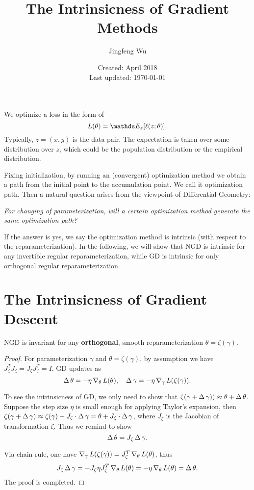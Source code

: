 \documentclass{article}
\title{The Intrinsicness of Gradient Methods}
\author{Jingfeng Wu}
\date{Created: April 2018 \\ Last updated: \today}
\begin{document}
\maketitle

We optimize a loss in the form of
\begin{equation}\label{eq:loss}
    L(\theta) = \Ebb_z [\ell(z;\theta)].
\end{equation}
Typically, $z = (x,y)$ is the data pair. The expectation is taken over some distribution over $z$, which could be the population distribution or the empirical distribution.

Fixing initialization, by running an (convergent) optimization method we obtain a path from the initial point to the accumulation point. We call it optimization path.
Then a natural question arises from the viewpoint of Differential Geometry:

\emph{For changing of parameterization, will a certain optimization method generate the same optimization path?}

If the answer is yes, we say the optimization method is intrinsic (with respect to the reparameterization).
In the following, we will show that NGD is intrinsic for any invertible regular reparameterization, while GD is intrinsic for only orthogonal regular reparameterization.

\section{The Intrinsicness of Gradient Descent}
\begin{thm}\label{thm:gd}
NGD is invariant for any \textbf{orthogonal}, smooth reparameterization $\theta = \zeta (\gamma)$.
\end{thm}
\begin{proof}
For parameterization $\gamma$ and $\theta=\zeta(\gamma)$, by assumption we have $J_{\zeta}^T J_{\zeta} = J_{\zeta} J_{\zeta}^T = I$.
GD updates as
\begin{equation}
    \operatorname{\Delta}\theta = -\eta \operatorname{\nabla}_{\theta} L(\theta),\quad
    \operatorname{\Delta} \gamma = -\eta \operatorname{\nabla}_{\gamma} L(\zeta(\gamma)).
\end{equation}

To see the intrinsicness of GD, we only need to show that
$\zeta(\gamma + \operatorname{\Delta}\gamma)) \approx \theta + \operatorname{\Delta}\theta$.
Suppose the step size $\eta$ is small enough for applying Taylor's expansion, then
$\zeta(\gamma + \operatorname{\Delta}\gamma) \approx \zeta(\gamma) + J_{\zeta} \cdot \operatorname{\Delta}\gamma = \theta + J_{\zeta} \cdot \operatorname{\Delta}\gamma$,
where $J_{\zeta}$ is the Jacobian of transformation $\zeta$.
Thus we remind to show
\begin{equation}
    \operatorname{\Delta}\theta = J_{\zeta} \operatorname{\Delta}\gamma.
\end{equation}

Via chain rule, one have $\operatorname{\nabla}_{\gamma} L(\zeta(\gamma)) = J_{\zeta}^T \operatorname{\nabla}_{\theta} L(\theta)$, thus
\begin{equation}
    J_{\zeta} \operatorname{\Delta} \gamma = -J_{\zeta} \eta J_{\zeta}^T \operatorname{\nabla}_{\theta}L(\theta) = -\eta\operatorname{\nabla}_{\theta}L(\theta) = \operatorname{\Delta} \theta.
\end{equation}
The proof is completed.
\end{proof}
\end{document}
